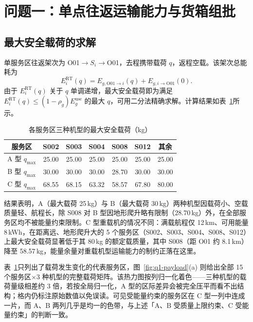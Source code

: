 \section{问题一：单点往返运输能力与货箱组批}

\subsection{最大安全载荷的求解}

单服务区往返架次为 O01$\to S_i\to$O01，去程携带载荷 $q$，返程空载。该架次总能耗为
\begin{equation}
	E_i^{\mathrm{RT}}(q)=E_{g,\mathrm{O01}\to i}(q)+E_{g,i\to \mathrm{O01}}(0).
\end{equation}
由于 $E_i^{\mathrm{RT}}(q)$ 关于 $q$ 单调递增，最大安全载荷即为满足 $E_i^{\mathrm{RT}}(q)\le(1-\rho_g)E_g^{\mathrm{use}}$ 的最大 $q$，可用二分法精确求解。计算结果如表~\ref{tab:q1-maxpayload}所示。

\begin{table}[htbp]
	\caption{各服务区三种机型的最大安全载荷（kg）}
	\label{tab:q1-maxpayload}
	\centering
	\begin{tabular}{ccccccc}
		\toprule
		服务区 & S002 & S003 & S004 & S008 & S012 & 其余 \\
		\midrule
		A 型 $q_{\max}$ & 25.00 & 25.00 & 25.00 & 25.00 & 25.00 & 25.00 \\
		B 型 $q_{\max}$ & 30.00 & 30.00 & 30.00 & 28.70 & 30.00 & 30.00 \\
		C 型 $q_{\max}$ & 68.55 & 68.15 & 63.32 & 58.57 & 67.80 & 80.00 \\
		\bottomrule
	\end{tabular}
\end{table}

结果表明，A（最大载荷 25\,kg）与 B（最大载荷 30\,kg）两种机型因载荷小、空载质量轻、航程长，除 S008 对 B 型因地形爬升略有限制（$28.70$\,kg）外，在全部服务区均不被能量约束限制。C 型重载机的情况不同：满载航程仅 12\,km、可用能量 8\,kWh，在距离远、地形爬升大的 5 个服务区（S002、S003、S004、S008、S012）上最大安全载荷显著低于其 80\,kg 的额定载质量，其中 S008（距 O01 约 8.1\,km）降至 58.57\,kg，能量余量对重载机型运输能力的制约正落在这里。

表~\ref{tab:q1-maxpayload}只列出了载荷发生变化的代表服务区，图~\ref{fig:q1-payload}(a) 则给出全部 15 个服务区$\times$3 种机型的完整载荷矩阵。该热力图按列归一化着色——三种机型的载荷量级相差约 3 倍，若按全局归一化，A 型的区际差异会被完全压平而看不出结构；格内仍标注原始数值以免误读。可见受能量约束的服务区在 C 型一列中连成一片，而 A、B 两列几乎是均一的色带，与上述「A、B 受质量上限约束、C 受能量约束」的判断一致。

